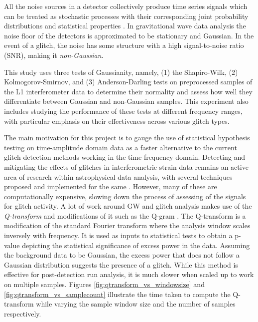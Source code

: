 \documentclass[12pt]{article}
\begin{document}

\medskip
\noindent All the noise sources in a detector collectively produce time series signals which can be treated as stochastic processes with their corresponding joint probability distributions and statistical properties \cite{collaboration_guide_2020}. In gravitational wave data analysis the noise floor of the detectors is approximated to be stationary and Gaussian. In the event of a glitch, the noise has some structure with a high signal-to-noise ratio (SNR), making it \textit{non-Gaussian}. 

\medskip
\noindent This study uses three tests of Gaussianity, namely, (1) the Shapiro-Wilk, (2) Kolmogorov-Smirnov, and (3) Anderson-Darling tests on preprocessed samples of the L1 interferometer data to determine their normality and assess how well they differentiate between Gaussian and non-Gaussian samples. This experiment also includes studying the performance of these tests at different frequency ranges, with particular emphasis on their effectiveness across various glitch types.

\medskip
\noindent The main motivation for this project is to gauge the use of statistical hypothesis testing on time-amplitude domain data as a faster alternative to the current glitch detection methods working in the time-frequency domain. Detecting and mitigating the effects of glitches in interferometric strain data remains an active area of research within astrophysical data analysis, with several techniques proposed and implemented for the same \cite{robinet_omicron_2020, MACLEOD2021100657, davis_subtracting_2022}. However, many of these are computationally expensive, slowing down the process of assessing of the signals for glitch activity. A lot of work around GW and glitch analysis makes use of the \textit{Q-transform} \cite{chatterji_multiresolution_2004,Zevin_2017,soni2023qoqqtransformbasedtest} and modifications of it such as the Q-gram \cite{vazsonyi_identifying_2023}. The Q-transform is a modification of the standard Fourier transform where the analysis window scales inversely with frequency. It is used as inputs to statistical tests to obtain a p-value depicting the statistical significance of excess power in the data. Assuming the background data to be Gaussian, the excess power that does not follow a Gaussian distribution suggests the presence of a glitch. While this method is effective for post-detection run analysis, it is much slower when scaled up to work on multiple samples. Figures \ref{fig:qtransform_vs_windowsize} and \ref{fig:qtransform_vs_samplecount} illustrate the time taken to compute the Q-transform while varying the sample window size and the number of samples respectively. 
\end{document}
